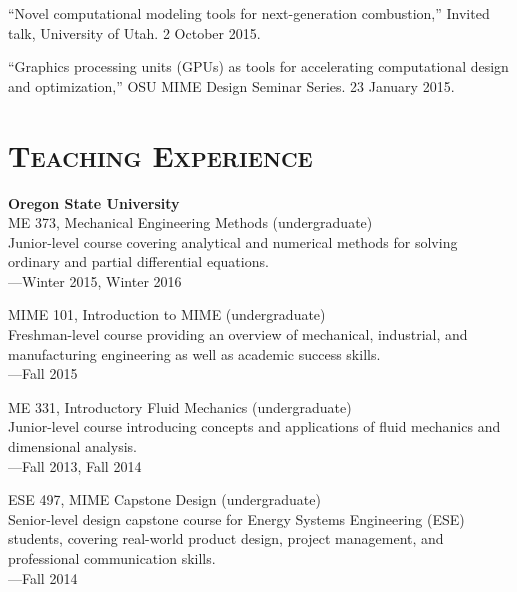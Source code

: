 \documentclass[margin,line,11pt]{res}
\makeatletter
\newlength{\bibhang}
\newlength{\bibsep}
 {\@listi \global\bibsep\itemsep \global\advance\bibsep by\parsep}
\newenvironment{bibenum*}
  {\renewcommand\labelenumi{\theenumi.}%
   \etaremune[
     topsep=0pt,
     itemsep=\bibsep,
     parsep=0pt,partopsep=0pt,
     itemindent=-\bibhang,
     leftmargin={\bibhang+\widthof{[999]}}]}
  {\endetaremune}
\newcommand*{\doi}[1]{\href{http://dx.doi.org/#1}{\nolinkurl{doi:#1}}}
\makeatother
\begin{document}
\begin{resume}
\begin{bibenum*}
\item ``Novel computational modeling tools for next-generation combustion,'' Invited talk, University of Utah. 2 October 2015.

\item ``Graphics processing units (GPUs) as tools for accelerating computational design and optimization,'' OSU MIME Design Seminar Series. 23 January 2015.

\end{bibenum*}

%
%
%

\section{\textsc{Teaching Experience}}

\textbf{Oregon State University} \\
ME 373, Mechanical Engineering Methods (undergraduate) \\
Junior-level course covering analytical and numerical methods for solving ordinary and partial differential equations. \\
---Winter 2015, Winter 2016

MIME 101, Introduction to MIME (undergraduate) \\
Freshman-level course providing an overview of mechanical, industrial, and manufacturing engineering as well as academic success skills. \\
---Fall 2015

ME 331, Introductory Fluid Mechanics (undergraduate) \\
Junior-level course introducing concepts and applications of fluid mechanics and dimensional analysis. \\
---Fall 2013, Fall 2014

ESE 497, MIME Capstone Design (undergraduate) \\
Senior-level design capstone course for Energy Systems Engineering (ESE) students, covering real-world product design, project management, and professional communication skills. \\
---Fall 2014


\end{resume}
\end{document}
